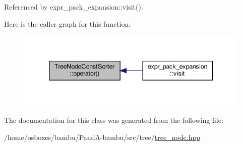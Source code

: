 Referenced by expr\+\_\+pack\+\_\+expansion\+::visit().

Here is the caller graph for this function\+:
\nopagebreak
\begin{figure}[H]
\begin{center}
\leavevmode
\includegraphics[width=339pt]{dd/d61/classTreeNodeConstSorter_a42292eb5fe44085fd0653313cbb89bc0_icgraph}
\end{center}
\end{figure}


The documentation for this class was generated from the following file\+:\begin{DoxyCompactItemize}
\item 
/home/osboxes/bambu/\+Pand\+A-\/bambu/src/tree/\hyperlink{tree__node_8hpp}{tree\+\_\+node.\+hpp}\end{DoxyCompactItemize}
